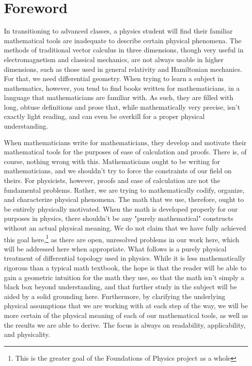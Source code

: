 \documentclass{book}
\begin{document}
\tableofcontents


\clearpage






\section{Foreword}
In transitioning to advanced classes, a physics student will find their familiar mathematical tools are inadequate to describe certain physical phenomena. The methods of traditional vector calculus in three dimensions, though very useful in electromagnetism and classical mechanics, are not always usable in higher dimensions, such as those used in general relativity and Hamiltonian mechanics. For that, we need differential geometry. When trying to learn a subject in mathematics, however, you tend to find books written for mathematicians, in a language that mathematicians are familiar with. As such, they are filled with long, obtuse definitions and prose that, while mathematically very precise, isn't exactly light reading, and can even be overkill for a proper physical understanding. 

When mathematicians write for mathematicians, they develop and motivate their mathematical tools for the purposes of ease of calculation and proofs. There is, of course, nothing wrong with this. Mathematicians ought to be writing for mathematicians, and we shouldn't try to force the constraints of our field on theirs. For physicists, however, proofs and ease of calculation are not the fundamental problems. Rather, we are trying to mathematically codify, organize, and characterize physical phenomena. The math that we use, therefore, ought to be entirely physically motivated. When the math is developed properly for our purposes in physics, there shouldn't be any "purely mathematical" constructs without an actual physical meaning. We do not claim that we have fully achieved this goal here,\footnote{This is the greater goal of the Foundations of Physics project as a whole} as there are open, unresolved problems in our work here, which will be addressed here when appropriate. 
What follows is a purely physical treatment of differential topology used in physics. While it is less mathematically rigorous than a typical math textbook, the hope is that the reader will be able to gain a geometric intuition for the math they use, so that the math isn't simply a black box beyond understanding, and that further study in the subject will be aided by a solid grounding here. Furthermore, by clarifying the underlying physical assumptions that we are working with at each step of the way, we will be more certain of the physical meaning of each of our mathematical tools, as well as the results we are able to derive.  The focus is always on readability, applicability, and physicality.
\end{document}
